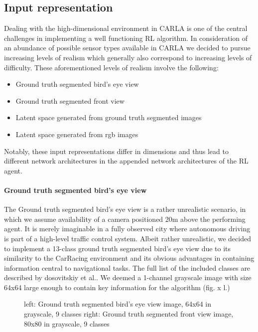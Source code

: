 \documentclass[letterpaper, 10 pt, conference]{ieeeconf}  %
\begin{document}
\subsection{Input representation}
Dealing with the high-dimensional environment in CARLA is one of the central challenges in implementing a well functioning 
RL algorithm. In consideration of an abundance of possible sensor types available in CARLA we decided to pursue increasing
levels of realism which generally also correspond to increasing levels of difficulty. These aforementioned levels of realism involve the following:
\begin{itemize}
    \item Ground truth segmented bird's eye view
    \item Ground truth segmented front view
    \item Latent space generated from ground truth segmented images
    \item Latent space generated from rgb images
\end{itemize}
Notably, these input representations differ in dimensions and thus lead to different network architectures in the appended network architectures 
of the RL agent. 
\paragraph{Ground truth segmented bird's eye view}
The Ground truth segmented bird's eye view is a rather unrealistic scenario, in which we assume availability of a camera positioned 
20m above the performing agent. It is merely imaginable in a fully observed city where autonomous driving is part of a high-level traffic 
control system. Albeit rather unrealistic, we decided to implement a 13-class ground truth segmented bird's eye view due to its similarity to 
the CarRacing 
environment and its obvious advantages in containing information central to navigational tasks. The full list of the 
included classes are described by dosovitskiy et al.\cite{dosovitskiy2017carla}. We deemed a 1-channel 
grayscale image with size 64x64 
large enough to contain key information for the algorithm (fig. x l.)

\begin{figure}[thpb]
    \centering
    \caption{left: Ground truth segmented bird's eye view image, 64x64 in grayscale, 9 classes
    right: Ground truth segmented front view image, 80x80 in grayscale, 9 classes}
        \label{figurelabel}
        \end{figure}
\end{document}
